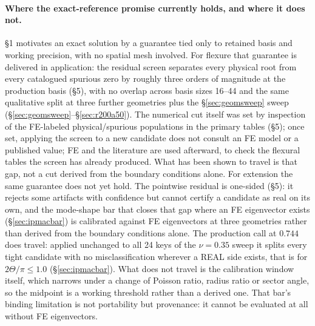 \documentclass[11pt]{article}
\begin{document}
\paragraph{Where the exact-reference promise currently holds, and where
it does not.} \S1 motivates an exact solution by a guarantee tied only to retained basis and working precision, with no spatial mesh involved. For flexure that guarantee is delivered in application: the residual
screen separates every physical root from every catalogued spurious zero
by roughly three orders of magnitude at the production basis (\S5), with
no overlap across basis sizes 16--44 and the same qualitative split at
three further geometries plus the \S\ref{sec:geomsweep} sweep
(\S\ref{sec:geomsweep}--\S\ref{sec:r200a50}). The numerical cut itself
was set by inspection of the FE-labeled physical/spurious populations in
the primary tables (\S5); once set, applying the screen to a new
candidate does not consult an FE model or a published value; FE and
the literature are used afterward, to check the flexural tables the
screen has already produced. What has been shown to travel is that gap,
not a cut derived from the boundary conditions alone. For extension the
same guarantee does not yet hold.
The pointwise residual is one-sided (\S5): it rejects some artifacts with
confidence but cannot certify a candidate as real on its own, and the
mode-shape bar that closes that gap where an FE eigenvector exists
(\S\ref{sec:ipmacbar}) is calibrated against FE eigenvectors at three
geometries rather than derived from the boundary conditions alone. The
production call at $0.744$ does travel: applied unchanged to all 24 keys
of the $\nu=0.35$ sweep it splits every tight candidate with no
misclassification wherever a REAL side exists, that is for
$2\Theta/\pi\le1.0$ (\S\ref{sec:ipmacbar}). What does not travel is the
calibration window itself, which narrows under a change of Poisson ratio,
radius ratio or sector angle, so the midpoint is a working threshold
rather than a derived one. That bar's binding limitation is not
portability but provenance: it cannot be evaluated at all without FE
eigenvectors.
\end{document}
